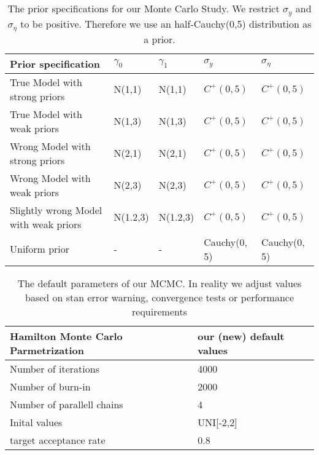 \begin{table}[!ht]
\begin{center}
\begin{tabular}{l l l l l}
Prior specification & $\gamma_0$ & $\gamma_1$ & $\sigma_y$ & $\sigma_\eta$\\
\hline
True Model with strong priors & N(1,1) & N(1,1) & $C^+(0, 5)$ & $C^+(0, 5)$\\
True Model with weak priors & N(1,3) & N(1,3) & $C^+(0, 5)$ & $C^+(0, 5)$\\
Wrong Model with strong priors & N(2,1) & N(2,1) & $ C^+(0, 5)$ &$ C^+(0, 5)$\\
Wrong Model with weak priors & N(2,3) & N(2,3) &$ C^+(0, 5)$ & $ C^+(0, 5)$\\
Slightly wrong Model with weak priors & N(1.2,3) & N(1.2,3) &$ C^+(0, 5)$ & $C^+(0, 5)$\\
Uniform prior & - & - & Cauchy(0, 5) & Cauchy(0, 5)\\
\end{tabular}
\end{center}
\caption{The prior specifications for our Monte Carlo Study. We restrict  $\sigma_y$ and  $\sigma_\eta$ to be positive.
Therefore we use an half-Cauchy(0,5) distribution as a prior.}
\label{tab:relational_table}
\end{table}

\begin{table}[!ht]
\begin{center}
\begin{tabular}{l l}
Hamilton Monte Carlo Parmetrization & our (new) default values\\
\hline
Number of iterations &4000  \\
Number of burn-in & 2000  \\
Number of parallell chains & 4  \\
Inital values & UNI[-2,2]  \\
target acceptance rate & 0.8  \\

\end{tabular}
\end{center}
\caption{The default parameters of our MCMC. In reality we adjust values based on stan error warning, convergence tests or performance requirements}
\label{tab:relational_table}
\end{table}


